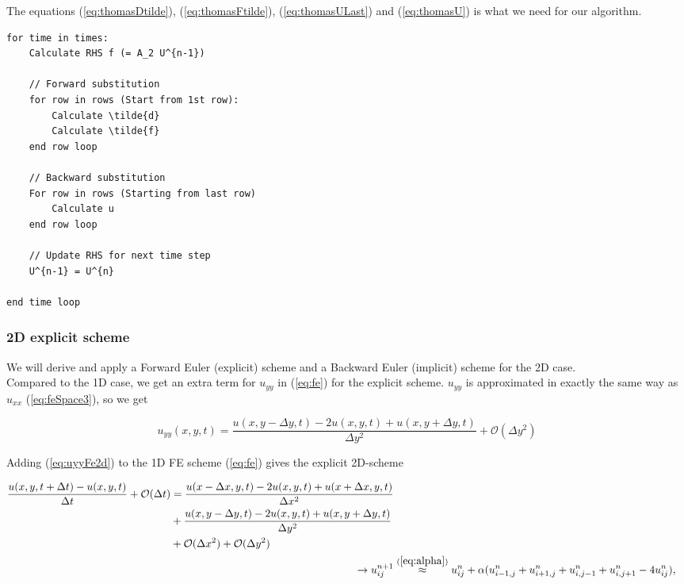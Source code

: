 \documentclass{article}
\begin{document}
The equations (\ref{eq:thomasDtilde}), (\ref{eq:thomasFtilde}), (\ref{eq:thomasULast}) and (\ref{eq:thomasU}) is what we need for our algorithm.

\begin{lstlisting}
for time in times:
	Calculate RHS f (= A_2 U^{n-1})
	
	// Forward substitution
	for row in rows (Start from 1st row):
		Calculate \tilde{d}
		Calculate \tilde{f}
	end row loop
	
	// Backward substitution
	For row in rows (Starting from last row)
		Calculate u
	end row loop

	// Update RHS for next time step
	U^{n-1} = U^{n}

end time loop
\end{lstlisting}

\subsubsection{2D explicit scheme}
We will derive and apply a Forward Euler (explicit) scheme and a Backward Euler (implicit) scheme for the 2D case.\\

Compared to the 1D case, we get an extra term for $u_{yy}$ in (\ref{eq:fe}) for the explicit scheme. $u_{yy}$ is approximated in exactly the same way as $u_{xx}$ (\ref{eq:feSpace3}), so we get

\begin{equation}
	 u_{yy}(x,y,t) = \frac{u(x,y - \Delta y, t) - 2u(x,y,t) + u(x,y+ \Delta y, t)}{\Delta y^2} + \mathcal{O}(\Delta y^2)\label{eq:uyyFe2d}
\end{equation}

Adding (\ref{eq:uyyFe2d}) to the 1D FE scheme (\ref{eq:fe}) gives the explicit 2D-scheme

\begin{subequations}
	\begin{align}
		\begin{split}
			\frac{u(x,y, t+ \Delta t) - u(x,y,t)}{\Delta t} + \mathcal{O}(\Delta t) &= 
			\frac{u(x - \Delta x, y,t) - 2u(x,y,t) + u(x+ \Delta x,y, t)}{\Delta x^2} \\
			&+  \frac{u(x,y - \Delta y, t) - 2u(x,y,t) + u(x,y+ \Delta y, t)}{\Delta y^2} \\
			&+ \mathcal{O}(\Delta x^2)  + \mathcal{O}(\Delta y^2)
		\end{split}\\
		\rightarrow u_{ij}^{n+1} &\stackrel{(\ref{eq:alpha})}{\approx} u_{ij}^{n} + \alpha (u_{i-1,j}^n + u_{i+1,j}^n + u_{i,j-1}^n + u_{i,j+1}^n - 4u_{ij}^n),\label{eq:Fe2d}
	\end{align}
\end{subequations}
\end{document}
